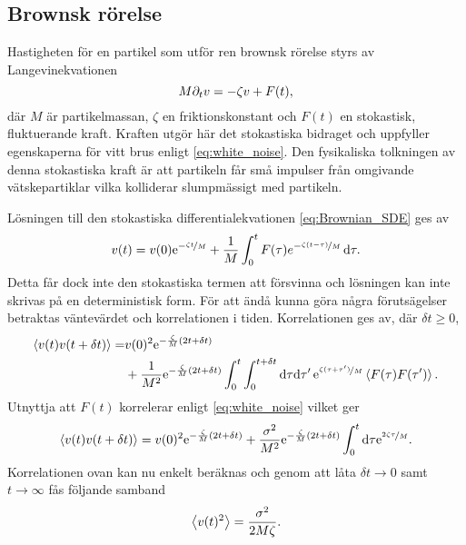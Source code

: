




\subsection{Brownsk rörelse}\label{sec:brown}
Hastigheten för en partikel som utför ren brownsk rörelse styrs av
Langevinekvationen~\cite{Mazo_Brownian2002} 
\begin{equation} \label{eq:Brownian_SDE}
    M\partial_tv=-\zeta v + F(t),
\end{equation}
där $M$ är partikelmassan, $\zeta$ en friktionskonstant och $F(t)$ en
stokastisk, fluktuerande kraft. Kraften utgör här det stokastiska
bidraget och uppfyller egenskaperna för vitt brus enligt \eqref{eq:white_noise}.
Den fysikaliska tolkningen av denna stokastiska kraft är att partikeln
får små impulser från omgivande vätskepartiklar vilka kolliderar
slumpmässigt med partikeln.  

Lösningen till den stokastiska differentialekvationen
\eqref{eq:Brownian_SDE} ges av  
\begin{equation}
v(t)
=v(0)\mathrm{e}^{-\nicefrac{\zeta t}{M}}
 +\frac{1}{M}\int^t_0 F(\tau)e^{-\nicefrac{\zeta (t-\tau)}{M}} \,\mathrm{d}\tau.
\end{equation}
Detta får dock inte den stokastiska termen att försvinna och lösningen kan inte skrivas på en deterministisk form. För att ändå kunna göra några förutsägelser betraktas väntevärdet och korrelationen i tiden. Korrelationen ges av, där $\delta t\geq0$,
\begin{equation}
\begin{aligned}
\ev{v(t)v(t+\delta t)} 
=& v(0)^2\ee^{-\frac{\zeta}{M}(2t+\delta t)}\\
 &+ \frac{1}{M^2}\ee^{-\frac{\zeta}{M} (2t+\delta t)}
  \int_0^t\int_0^{t+\delta t}\dd\tau\dd\tau'\, 
     \ee^{\nicefrac{\zeta (\tau+\tau')}{M}}\ev{F(\tau)F(\tau')}.
\end{aligned}
\end{equation}
Utnyttja att $F(t)$ korrelerar enligt \eqref{eq:white_noise} vilket ger 
\begin{equation} \label{eq:Brown_korr}
\ev{v(t)v(t+\delta t)} 
= v(0)^2\ee^{-\frac{\zeta}{M}(2t+\delta t)}
 +\frac{\sigma^2}{M^2}\ee^{-\frac{\zeta}{M} (2t+\delta t)}
  \int_0^t\dd\tau\ee^{\nicefrac{2\zeta \tau}{M}}.
\end{equation}
Korrelationen ovan kan nu enkelt beräknas och genom att låta $\delta t\to 0$ samt $t\to \infty$ fås följande samband
\begin{equation}
    \ev{v(t)^2} = \frac{\sigma^2}{2M\zeta}.
\end{equation}

